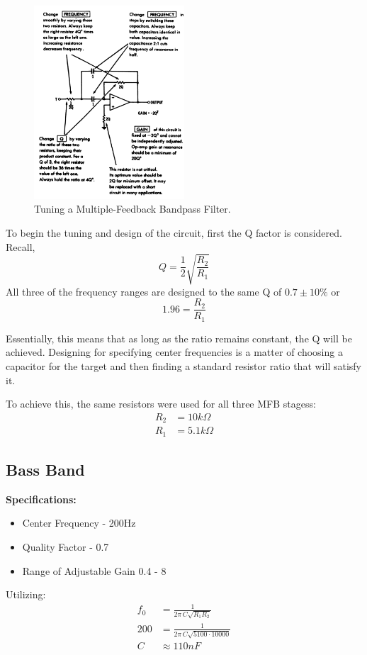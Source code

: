 \documentclass[12pt]{article}
\begin{document}
\begin{figure}[H]
	\centering
	\includegraphics[width=0.5\textwidth]{tuning}
	\caption{Tuning a Multiple-Feedback Bandpass Filter.}
	\label{fig:tuning}
\end{figure}
To begin the tuning and design of the circuit, first the Q factor is considered. Recall,
\[
	Q = \frac{1}{2}\sqrt{\frac{R_2}{R_1}}
\]
All three of the frequency ranges are designed to the same Q of $0.7 \pm 10\%$ or
	\[
		1.96 = \frac{R_2}{R_1}
	\]

Essentially, this means that as long as the ratio remains constant, the Q will be achieved.
Designing for specifying center frequencies is a matter of choosing a capacitor for the target and then finding a standard resistor ratio that will satisfy it.

To achieve this, the same resistors were used for all three MFB stagess:
\begin{align*}
	R_2 &= 10k\Omega\\
	R_1 &= 5.1k\Omega
\end{align*}

\subsection{Bass Band}
\noindent \textbf{Specifications:}
\begin{itemize}
	\item Center Frequency - 200Hz
	\item Quality Factor - 0.7
	\item Range of Adjustable Gain 0.4 - 8
\end{itemize}
Utilizing:
\begin{align*}
	f_0 & = \frac{1}{2\pi\,C\sqrt{R_1R_2}}     \\
	200 & = \frac{1}{2\pi\,C\sqrt{5100\cdot10000}}\\
	C & \approx 110nF\\
\end{align*}
\end{document}
